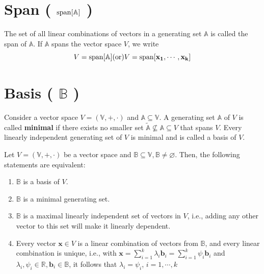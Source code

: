 \section{Span ( $\operatorname{span}[\mathbb{A}]$ ) \cite{mfml-1}} \label{lin-alg: Span}
The set of all linear combinations of vectors in a generating set $\mathbb{A}$ is called the span of $\mathbb{A}$. If $\mathbb{A}$ spans the vector space $V$, we write 
\[
    \hfill
    V = \rcmdXspan[\mathbb{A}]
    \hfill
    \text{(or)}
    \hfill
    V = \rcmdXspan[\mathbf{x_1, \cdots , x_k}]
    \hfill
\]













\section{Basis ( $\mathbb{B}$ ) \cite{mfml-1}}\label{lin-alg: Basis}
Consider a vector space $V = (\mathbb{V}, +, \cdot)$ and $\mathbb{A} \subseteq \mathbb{V}$. A generating set $\mathbb{A}$ of $V$ is called \textbf{minimal} if there exists no smaller set $\tilde{\mathbb{A}} \not\subseteq \mathbb{A} \subseteq V$ that spans $V$. Every linearly independent generating set of $V$ is minimal and is called a basis of $V$.

\vspace{0.2cm}
Let $V = (\mathbb{V}, +, \cdot)$ be a vector space and $\mathbb{B} \subseteq \mathbb{V}, \mathbb{B} \neq \varnothing$. Then, the following statements are equivalent:

\begin{enumerate}
    \item $\mathbb{B}$ is a basis of $V$.
    
    \item $\mathbb{B}$ is a minimal generating set.
    
    \item $\mathbb{B}$ is a maximal linearly independent set of vectors in $V$, i.e., adding any other vector to this set will make it linearly dependent.

    \item Every vector $\mathbf{x} \in V$ is a linear combination of vectors from $\mathbb{B}$, and every linear combination is unique, i.e., with \( \displaystyle \mathbf{x} = \sum_{i=1}^{k} \lambda_i \mathbf{b}_i = \sum_{i=1}^{k} \psi_i \mathbf{b}_i \) and $\lambda_i, \psi_i \in \mathbb{R}, \mathbf{b}_i \in \mathbb{B}$, it follows that $\lambda_i = \psi_i$, $i=1,\cdots,k$

    
\end{enumerate}

